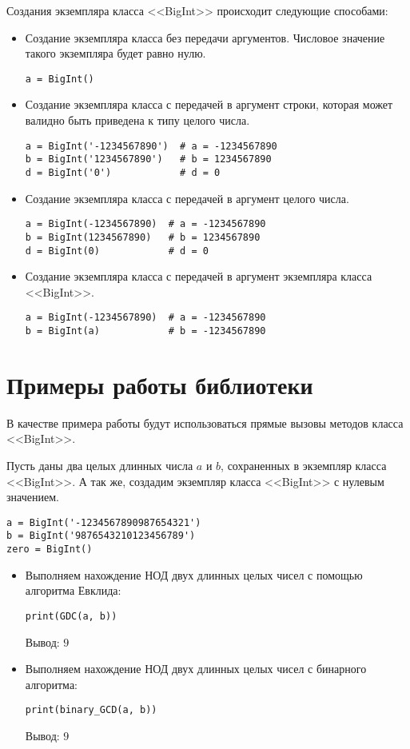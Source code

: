 Создания экземпляра класса <<BigInt>> происходит следующие способами:
\begin{itemize}
    \item Создание экземпляра класса без передачи аргументов. Числовое значение такого экземпляра будет равно нулю.
    \begin{lstlisting}
a = BigInt()\end{lstlisting}
    \item Создание экземпляра класса с передачей в аргумент строки, которая может валидно быть приведена к типу целого числа.
    \begin{lstlisting}
a = BigInt('-1234567890')  # a = -1234567890
b = BigInt('1234567890')   # b = 1234567890
d = BigInt('0')            # d = 0\end{lstlisting}
    \item Создание экземпляра класса с передачей в аргумент целого числа.
    \begin{lstlisting}
a = BigInt(-1234567890)  # a = -1234567890
b = BigInt(1234567890)   # b = 1234567890
d = BigInt(0)            # d = 0\end{lstlisting}
    \item Создание экземпляра класса с передачей в аргумент экземпляра класса <<BigInt>>.
    \begin{lstlisting}
a = BigInt(-1234567890)  # a = -1234567890
b = BigInt(a)            # b = -1234567890\end{lstlisting}
\end{itemize}


\clearpage
\section{Примеры работы библиотеки}
В качестве примера работы будут использоваться прямые вызовы методов класса <<BigInt>>.

Пусть даны два целых длинных числа $a$ и $b$, сохраненных в экземпляр класса <<BigInt>>.
А так же, создадим экземпляр класса <<BigInt>> с нулевым значением.
    \begin{lstlisting}
a = BigInt('-1234567890987654321')
b = BigInt('9876543210123456789')
zero = BigInt()\end{lstlisting}

    \begin{itemize}
        \item Выполняем нахождение НОД двух длинных целых чисел с помощью алгоритма Евклида:
        \begin{lstlisting}
print(GDC(a, b))\end{lstlisting}
        Вывод: $9$
        \item Выполняем нахождение НОД двух длинных целых чисел с бинарного алгоритма:
        \begin{lstlisting}
print(binary_GCD(a, b))\end{lstlisting}
        Вывод: $9$
    \end{itemize}

